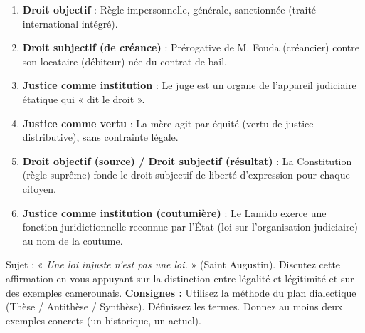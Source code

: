 \documentclass[11pt]{article}
\begin{document}
\begin{corrige}[Exercice 1]
\begin{enumerate}
\item \textbf{Droit objectif} : Règle impersonnelle, générale, sanctionnée (traité international intégré).
\item \textbf{Droit subjectif (de créance)} : Prérogative de M. Fouda (créancier) contre son locataire (débiteur) née du contrat de bail.
\item \textbf{Justice comme institution} : Le juge est un organe de l'appareil judiciaire étatique qui « dit le droit ».
\item \textbf{Justice comme vertu} : La mère agit par équité (vertu de justice distributive), sans contrainte légale.
\item \textbf{Droit objectif (source) / Droit subjectif (résultat)} : La Constitution (règle suprême) fonde le droit subjectif de liberté d'expression pour chaque citoyen.
\item \textbf{Justice comme institution (coutumière)} : Le Lamido exerce une fonction juridictionnelle reconnue par l'État (loi sur l'organisation judiciaire) au nom de la coutume.
\end{enumerate}
\end{corrige}

\begin{exercice}
Sujet : « \emph{Une loi injuste n'est pas une loi.} » (Saint Augustin). Discutez cette affirmation en vous appuyant sur la distinction entre légalité et légitimité et sur des exemples camerounais.
\textbf{Consignes :} Utilisez la méthode du plan dialectique (Thèse / Antithèse / Synthèse). Définissez les termes. Donnez au moins deux exemples concrets (un historique, un actuel).
\end{exercice}
\end{document}
